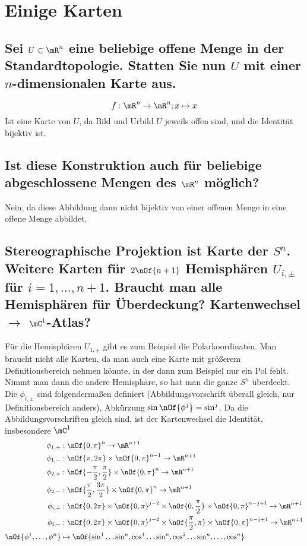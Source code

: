 \section{Einige Karten}

\subsection{Sei $U \subset \mR^n$ eine beliebige offene Menge in der Standardtopologie. Statten Sie nun $U$ mit einer $n$-dimensionalen Karte aus.}
\begin{equation}
	f : \mR^n \to \mR^n; x \mapsto x
\end{equation}
Ist eine Karte von $U$, da Bild und Urbild $U$ jeweils offen sind, und die Identität bijektiv ist.

\subsection{Ist diese Konstruktion auch für beliebige abgeschlossene Mengen des $\mR^n$ möglich?}
Nein, da diese Abbildung dann nicht bijektiv von einer offenen Menge in eine offene Menge abbildet.

\subsection{Stereographische Projektion ist Karte der $S^n$. Weitere Karten für $2\nOf{n+1}$ Hemisphären $U_{i,\pm}$ für $i = 1,\dots,n+1$. Braucht man alle Hemisphären für Überdeckung? Kartenwechsel $\rightarrow$ $\mC^1$-Atlas?}
Für die Hemisphären $U_{1,\pm}$ gibt es zum Beispiel die Polarkoordinaten.
Man braucht nicht alle Karten, da man auch eine Karte mit größerem Definitionsbereich nehmen könnte, in der dann zum Beispiel nur ein Pol fehlt. Nimmt man dann die andere Hemisphäre, so hat man die ganze $S^n$ überdeckt.
Die $\phi_{i,\pm}$ sind folgendermaßen definiert (Abbildungsvorschrift überall gleich, nur Definitionsbereich anders), Abkürzung $\sin\nOf{\phi^j} = \sin^j$. Da die Abbildungsvorschriften gleich sind, ist der Kartenwechsel die Identität, insbesondere $\mC^1$
\begin{align}
	\phi_{1,+}&: \nOf{0,\pi}^n \to \mR^{n+1}\\
	\phi_{1,-}&: \nOf{\pi,2\pi}\times\nOf{0,\pi}^{n-1} \to \mR^{n+1}\\
	\phi_{2,+}&:	\nOf{-\frac{\pi}{2},\frac{\pi}{2}}\times\nOf{0,\pi}^n \to \mR^{n+1}\\
	\phi_{2,-}&:	\nOf{\frac{\pi}{2},\frac{3\pi}{2}}\times\nOf{0,\pi}^n \to \mR^{n+1}\\
	\phi_{i,+}&: \nOf{0,2\pi}\times\nOf{0,\pi}^{j-2}\times\nOf{0,\frac{\pi}{2}}\times\nOf{0,\pi}^{n-j+1} \to \mR^{n+1}\\
	\phi_{i,-}&: \nOf{0,2\pi}\times\nOf{0,\pi}^{j-2}\times\nOf{\frac{\pi}{2},\pi}\times\nOf{0,\pi}^{n-j+1} \to \mR^{n+1}\\
	\nOf{\phi^1,\dots,\phi^n} &\mapsto \nOf{\sin^1\dots\sin^n,\cos^1\dots\sin^n,\cos^2\dots\sin^n,\dots,\cos^n}
\end{align}

